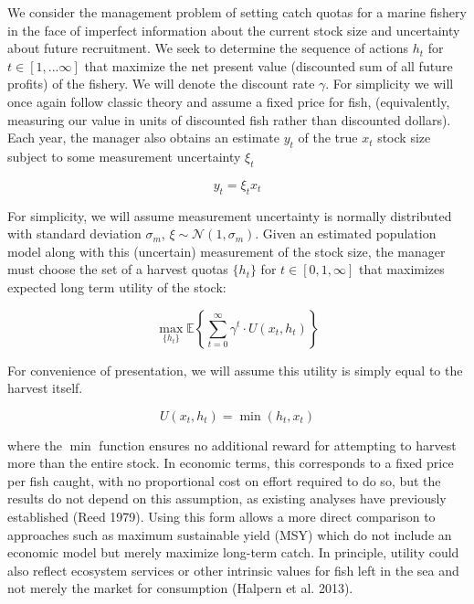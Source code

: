 \documentclass[3p]{elsarticle} %
\begin{document}
We consider the management problem of setting catch quotas for a marine
fishery in the face of imperfect information about the current stock
size and uncertainty about future recruitment. We seek to determine the
sequence of actions \(h_t\) for \(t \in [1, ... \infty]\) that maximize
the net present value (discounted sum of all future profits) of the
fishery. We will denote the discount rate \(\gamma\). For simplicity we
will once again follow classic theory and assume a fixed price for fish,
(equivalently, measuring our value in units of discounted fish rather
than discounted dollars). Each year, the manager also obtains an
estimate \(y_t\) of the true \(x_t\) stock size subject to some
measurement uncertainty \(\xi_t\)

\begin{equation}
y_t = \xi_t x_t 
\end{equation}

For simplicity, we will assume measurement uncertainty is normally
distributed with standard deviation \(\sigma_m\),
\(\xi \sim \mathcal{N}(1, \sigma_m)\). Given an estimated population
model along with this (uncertain) measurement of the stock size, the
manager must choose the set of a harvest quotas \(\lbrace h_t \rbrace\)
for \(t \in [0, 1, \infty]\) that maximizes expected long term utility
of the stock:

\begin{equation}
\max_{ \lbrace h_t \rbrace } \mathbb{E} \left \{ \sum_{t=0}^{\infty} \gamma^t \cdot U(x_t, h_t) \right \}
\end{equation}

For convenience of presentation, we will assume this utility is simply
equal to the harvest itself.

\begin{equation}
 U(x_t, h_t) = \min(h_t, x_t)
\end{equation}

where the \(\min\) function ensures no additional reward for attempting
to harvest more than the entire stock. In economic terms, this
corresponds to a fixed price per fish caught, with no proportional cost
on effort required to do so, but the results do not depend on this
assumption, as existing analyses have previously established (Reed
1979). Using this form allows a more direct comparison to approaches
such as maximum sustainable yield (MSY) which do not include an economic
model but merely maximize long-term catch. In principle, utility could
also reflect ecosystem services or other intrinsic values for fish left
in the sea and not merely the market for consumption (Halpern et al.
2013).
\end{document}
